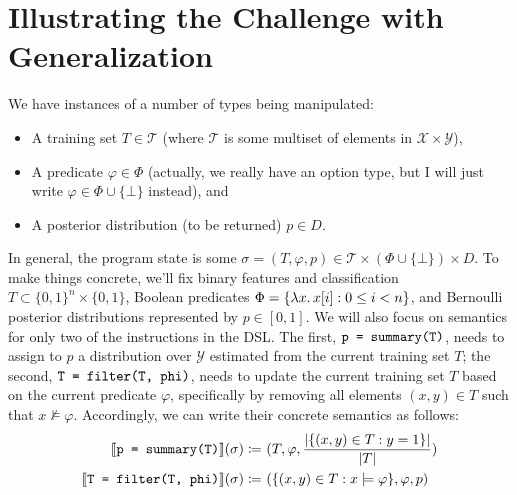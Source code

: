 \section{Illustrating the Challenge with Generalization}

We have instances of a number of types being manipulated:
\begin{itemize}
    \item A training set $T \in \mathcal{T}$
        (where $\mathcal{T}$ is some multiset of elements in $\mathcal{X} \times \mathcal{Y}$),
    \item A predicate $\varphi \in \Phi$
        (actually, we really have an option type,
        but I will just write $\varphi \in \Phi \cup \{\bot\}$ instead), and
    \item A posterior distribution (to be returned) $p \in D$.
\end{itemize}

In general, the program state is some
$\sigma = (T, \varphi, p) \in \mathcal{T} \times (\Phi \cup \{\bot\}) \times D$.
To make things concrete, we'll fix binary features and classification
$T \subset \{0,1\}^n \times \{0,1\}$,
Boolean predicates $\Phi = \{\lambda x \ldotp x[i] : 0 \leq i < n\}$,
and Bernoulli posterior distributions represented by $p \in [0, 1]$.
We will also focus on semantics for only two of the instructions in the DSL.
The first, $\texttt{p = summary(T)}$, needs to assign to $p$ a distribution over $\mathcal{Y}$
estimated from the current training set $T$;
the second, $\texttt{T = filter(T, } {} \texttt{phi)}$, needs to update the current training set $T$
based on the current predicate $\varphi$,
specifically by removing all elements $(x,y) \in T$ such that $x \not \models \varphi$.
Accordingly, we can write their concrete semantics as follows:
\begin{align*}
    \den{\summarynode}(\sigma) \coloneqq&~
    (T, \varphi, \frac{\lvert \{(x,y) \in T : y = 1\} \rvert}{\lvert T \rvert}) \\
    \den{\filternode}(\sigma) \coloneqq&~
    (\{(x,y) \in T : x \models \varphi\}, \varphi, p)
\end{align*}

